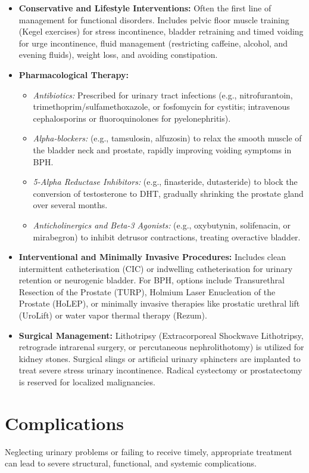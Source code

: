 \begin{itemize}
    \item \textbf{Conservative and Lifestyle Interventions:} Often the first line of management for functional disorders. Includes pelvic floor muscle training (Kegel exercises) for stress incontinence, bladder retraining and timed voiding for urge incontinence, fluid management (restricting caffeine, alcohol, and evening fluids), weight loss, and avoiding constipation.
    \item \textbf{Pharmacological Therapy:}
    \begin{itemize}
        \item \textit{Antibiotics:} Prescribed for urinary tract infections (e.g., nitrofurantoin, trimethoprim/sulfamethoxazole, or fosfomycin for cystitis; intravenous cephalosporins or fluoroquinolones for pyelonephritis).
        \item \textit{Alpha-blockers:} (e.g., tamsulosin, alfuzosin) to relax the smooth muscle of the bladder neck and prostate, rapidly improving voiding symptoms in BPH.
        \item \textit{5-Alpha Reductase Inhibitors:} (e.g., finasteride, dutasteride) to block the conversion of testosterone to DHT, gradually shrinking the prostate gland over several months.
        \item \textit{Anticholinergics and Beta-3 Agonists:} (e.g., oxybutynin, solifenacin, or mirabegron) to inhibit detrusor contractions, treating overactive bladder.
    \end{itemize}
    \item \textbf{Interventional and Minimally Invasive Procedures:} Includes clean intermittent catheterisation (CIC) or indwelling catheterisation for urinary retention or neurogenic bladder. For BPH, options include Transurethral Resection of the Prostate (TURP), Holmium Laser Enucleation of the Prostate (HoLEP), or minimally invasive therapies like prostatic urethral lift (UroLift) or water vapor thermal therapy (Rezum).
    \item \textbf{Surgical Management:} Lithotripsy (Extracorporeal Shockwave Lithotripsy, retrograde intrarenal surgery, or percutaneous nephrolithotomy) is utilized for kidney stones. Surgical slings or artificial urinary sphincters are implanted to treat severe stress urinary incontinence. Radical cystectomy or prostatectomy is reserved for localized malignancies.
\end{itemize}

\section*{Complications}
Neglecting urinary problems or failing to receive timely, appropriate treatment can lead to severe structural, functional, and systemic complications.

